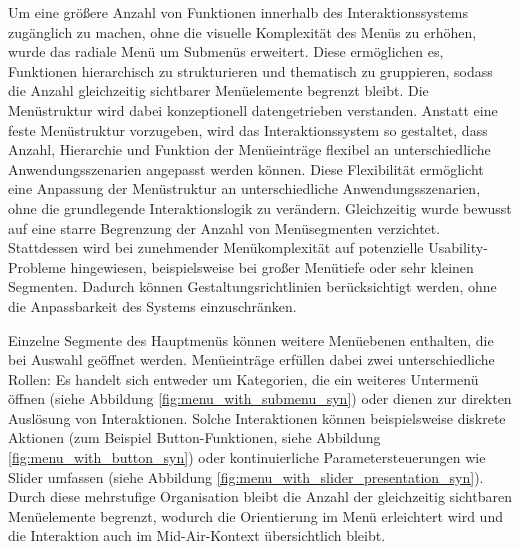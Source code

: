 Um eine größere Anzahl von Funktionen innerhalb des Interaktionssystems zugänglich zu machen, ohne die visuelle Komplexität des Menüs zu erhöhen, wurde das radiale Menü um Submenüs erweitert. Diese ermöglichen es, Funktionen hierarchisch zu strukturieren und thematisch zu gruppieren, sodass die Anzahl gleichzeitig sichtbarer Menüelemente begrenzt bleibt.
Die Menüstruktur wird dabei konzeptionell datengetrieben verstanden. Anstatt eine feste Menüstruktur vorzugeben, wird das Interaktionssystem so gestaltet, dass Anzahl, Hierarchie und Funktion der Menüeinträge flexibel an unterschiedliche Anwendungsszenarien angepasst werden können.
Diese Flexibilität ermöglicht eine Anpassung der Menüstruktur an unterschiedliche Anwendungsszenarien, ohne die grundlegende Interaktionslogik zu verändern. Gleichzeitig wurde bewusst auf eine starre Begrenzung der Anzahl von Menüsegmenten verzichtet. Stattdessen wird bei zunehmender Menükomplexität auf potenzielle Usability-Probleme hingewiesen, beispielsweise bei großer Menütiefe oder sehr kleinen Segmenten. Dadurch können Gestaltungsrichtlinien berücksichtigt werden, ohne die Anpassbarkeit des Systems einzuschränken.

Einzelne Segmente des Hauptmenüs können weitere Menüebenen enthalten, die bei Auswahl geöffnet werden. Menüeinträge erfüllen dabei zwei unterschiedliche Rollen: Es handelt sich entweder um Kategorien, die ein weiteres Untermenü öffnen (siehe Abbildung \ref{fig:menu_with_submenu_syn}) oder dienen zur direkten Auslösung von Interaktionen. Solche Interaktionen können beispielsweise diskrete Aktionen (zum Beispiel Button-Funktionen, siehe Abbildung \ref{fig:menu_with_button_syn}) oder kontinuierliche Parametersteuerungen wie Slider umfassen (siehe Abbildung \ref{fig:menu_with_slider_presentation_syn}).
Durch diese mehrstufige Organisation bleibt die Anzahl der gleichzeitig sichtbaren Menüelemente begrenzt, wodurch die Orientierung im Menü erleichtert wird und die Interaktion auch im Mid-Air-Kontext übersichtlich bleibt.

